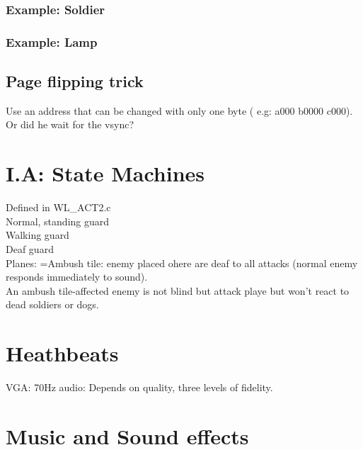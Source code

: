  \subsubsection{Example: Soldier} 
 \subsubsection{Example: Lamp}  
 
 
 
 
 
 
 
 
 
 
 
 
 
 
 
 
 \subsection{Page flipping trick}
 Use an address that can be changed with only one byte ( e.g: a000 b0000 c000).
 Or did he wait for the vsync?
\section{I.A: State Machines} 

Defined in WL\_ACT2.c\\
Normal, standing guard\\
Walking guard\\
Deaf guard\\

Planes:
=Ambush tile: enemy placed ohere are deaf to all attacks (normal enemy responds immediately to sound).\\
An ambush tile-affected enemy is not blind but attack playe but won't react to dead soldiers or dogs.\\



\section{Heathbeats}
VGA: 70Hz
audio: Depends on quality, three levels of fidelity.

\section{Music and Sound effects} 

